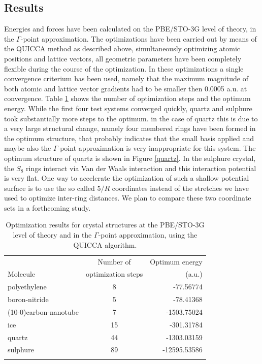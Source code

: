 \documentclass[prl,aps,preprint,superbib,12pt]{revtex4}
\begin{document}
\subsection{Results}
Energies and forces have been calculated on the PBE/STO-3G level of 
theory, in the $\Gamma$-point approximation. 
The optimizations have been carried out by means of the
QUICCA method as described above,
simultaneously optimizing atomic positions and lattice vectors,
all geometric parameters have been completely flexible during the 
course of the optimization.
In these optimizations a single
convergence criterium has been used, namely that the maximum
magnitude of both atomic and lattice vector gradients had to be
smaller then 0.0005 a.u. at convergence.
Table \ref{optsteps} shows the number of optimization steps and
the optimum energy. While the first four test systems converged quickly,
quartz and sulphure took substantially more steps to the optimum.
in the case of quartz this is due to a very large structural change,
namely four membered rings have been formed in the optimum structure,
that probably indicates that the small basis applied and maybe 
also the $\Gamma$-point approximation is very inappropriate
for this system. The optimum structure of quartz is shown in
Figure \ref{quartz}.
In the sulphure crystal, the $S_{8}$ rings interact via Van der Waals
interaction and this interaction potential is very flat. One way
to accelerate the optimization of such a shallow potential surface
is to use the so called $5/R$ coordinates instead of the stretches
we have used to optimize inter-ring distances. We plan to compare
these two coordinate sets in a forthcoming study.

\begin{table}[h]
\caption{Optimization results for crystal structures
at the PBE/STO-3G level of theory and in the $\Gamma$-point 
approximation, using the QUICCA algorithm.}
\label{optsteps}
\begin{tabular}{lcr}
\toprule
                       & Number of           & Optimum energy\\
Molecule               & optimization steps  &  (a.u.) \\
\colrule
polyethylene           & 8   &    -77.56774   \\
boron-nitride          & 5   &    -78.41368   \\
(10-0)carbon-nanotube         & 7   &  -1503.75024   \\
ice                    & 15  &   -301.31784   \\
quartz                 & 44  &  -1303.03159   \\
sulphure               & 89  & -12595.53586   \\
\botrule
\end{tabular}
\end{table}
\end{document}
